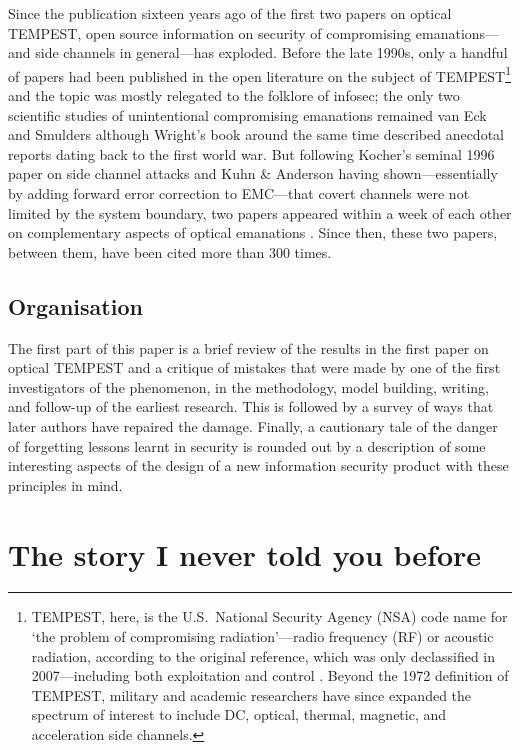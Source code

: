 \documentclass[conference]{IEEEtran}
\begin{document}
Since the publication sixteen years ago of the first two papers on optical
TEMPEST, open source information on security of compromising emanations---and
side channels in general---has exploded. Before the late 1990s, only a
handful of papers had been published in the open literature on the subject of
TEMPEST\footnote{TEMPEST, here, is the U.S.\ National Security Agency (NSA)
code name for `the problem of compromising radiation'---radio frequency (RF)
or acoustic radiation, according to the original reference, which was only
declassified in 2007---including both exploitation and control
\cite{NSATempest2007}. Beyond the 1972 definition of TEMPEST, military and
academic researchers have since expanded the spectrum of interest to include
DC, optical, thermal, magnetic, and acceleration side channels.} and the
topic was mostly relegated to the folklore of infosec; the only two
scientific studies of unintentional compromising emanations remained van Eck
\cite{vanEck1985} and Smulders \cite{Smulders1990} although Wright's book
around the same time \cite{Wright1987} described anecdotal reports dating
back to the first world war. But following Kocher's seminal 1996 paper on
side channel attacks \cite{Kocher1996} and Kuhn \& Anderson \cite{Kuhn1998a}
having shown---essentially by adding forward error correction to EMC---that
covert channels were not limited by the system boundary, two papers appeared
within a week of each other on complementary aspects of optical emanations
\cite{Kuhn2002,Loughry2002a}. Since then, these two papers, between them,
have been cited more than 300 times.

\subsection{Organisation}

The first part of this paper is a brief review of the results in the first
paper on optical TEMPEST and a critique of mistakes that were made by one
of the first investigators of the phenomenon, in the methodology, model
building, writing, and follow-up of the earliest research. This is followed
by a survey of ways that later authors have repaired the damage. Finally, a
cautionary
tale of the danger of forgetting lessons learnt in security is rounded out by
a description
of some interesting aspects of the design of a new information security
product with
these principles in mind.

\section{The story I never told you before}
\end{document}
